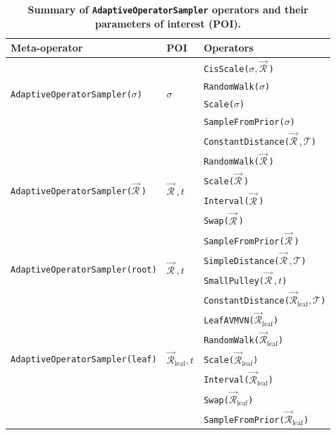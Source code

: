 \documentclass[10pt,letterpaper]{article}
\begin{document}
\begin{table}[h!]
\centering
\caption{\bf{Summary of \texttt{AdaptiveOperatorSampler} operators and their parameters of interest (POI).}}
\begin{tabular}{l l l} 
 Meta-operator & POI & Operators \\
\hline
 \multirow{4}{*}{\texttt{AdaptiveOperatorSampler($\sigma$)}} & \multirow{4}{*}{$\sigma$} & \texttt{CisScale($\sigma, \vec{\mathcal{R}}^{\,}$)} \\ 
 && \texttt{RandomWalk($\sigma$)}  \\
 && \texttt{Scale($\sigma$)}  \\
 && \texttt{SampleFromPrior($\sigma$)}  \\
 \hline
  \multirow{6}{*}{\texttt{AdaptiveOperatorSampler($\vec{\mathcal{R}}^{\,}$)}} & \multirow{6}{*}{$\vec{\mathcal{R}}^{\,}, t$} & \texttt{ConstantDistance($\vec{\mathcal{R}}^{\,}, \mathcal{T}$)}   \\ 
&& \texttt{RandomWalk($\vec{\mathcal{R}}^{\,}$)}  \\
&& \texttt{Scale($\vec{\mathcal{R}}^{\,}$)}   \\
&& \texttt{Interval($\vec{\mathcal{R}}^{\,}$)}   \\
&& \texttt{Swap($\vec{\mathcal{R}}^{\,}$)}  \\
&& \texttt{SampleFromPrior($\vec{\mathcal{R}}^{\,}$)} \\
 \hline
   \multirow{2}{*}{\texttt{AdaptiveOperatorSampler(root)}} & \multirow{2}{*}{$\vec{\mathcal{R}}^{\,}, t$} & \texttt{SimpleDistance($\vec{\mathcal{R}}^{\,}, \mathcal{T}$)}  \\ 
&&  \texttt{SmallPulley($\vec{\mathcal{R}}^{\,}, t$)}  \\
\hline
\hline
 \multirow{7}{*}{\texttt{AdaptiveOperatorSampler(leaf)}} & \multirow{7}{*}{$\vec{\mathcal{R}}^{\,}_\text{leaf}, t$} & \texttt{ConstantDistance($\vec{\mathcal{R}}^{\,}_\text{leaf}, \mathcal{T}$)}   \\ 
&& \texttt{LeafAVMVN($\vec{\mathcal{R}}^{\,}_\text{leaf}$)}  \\
&& \texttt{RandomWalk($\vec{\mathcal{R}}^{\,}_\text{leaf}$)}  \\
&& \texttt{Scale($\vec{\mathcal{R}}^{\,}_\text{leaf}$)}   \\
&& \texttt{Interval($\vec{\mathcal{R}}^{\,}_\text{leaf}$)}   \\
&& \texttt{Swap($\vec{\mathcal{R}}^{\,}_\text{leaf}$)}  \\
&& \texttt{SampleFromPrior($\vec{\mathcal{R}}^{\,}_\text{leaf}$)} \\

\end{tabular}
\end{table}
\end{document}
